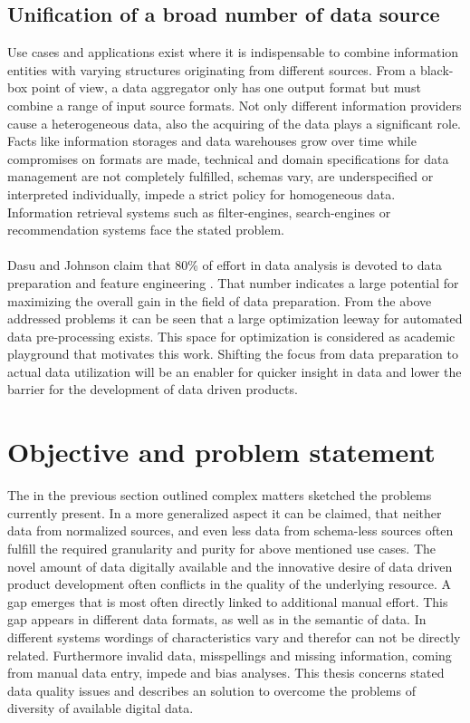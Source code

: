 \subsection{Unification of a broad number of data source} 

Use cases and applications exist where it is indispensable to combine information entities with varying structures originating from different sources. From a black-box point of view, a data aggregator only has one output format but must combine a range of input source formats. Not only different information providers cause a heterogeneous data, also the acquiring of the data plays a significant role. Facts like information storages and data warehouses grow over time while compromises on formats are made, technical and domain specifications for data management are not completely fulfilled, schemas vary, are underspecified or interpreted individually, impede a strict policy for homogeneous data. Information retrieval systems such as filter-engines, search-engines or recommendation systems face the stated problem. 
\\\\
Dasu and Johnson claim that 80\% of effort in data analysis is devoted to data preparation and feature engineering \cite{dasu_johnson_2003}. That number indicates a large potential for maximizing the overall gain in the field of data preparation. From the above addressed problems it can be seen that a large optimization leeway for automated data pre-processing exists. This space for optimization is considered as academic playground that motivates this work. Shifting the focus from data preparation to actual data utilization will be an enabler for quicker insight in data and lower the barrier for the development of data driven products.

\section{Objective and problem statement\label{sec:objective}}
The in the previous section outlined complex matters sketched the problems currently present. In a more generalized aspect it can be claimed, that neither data from normalized sources, and even less data from schema-less sources often fulfill the required granularity and purity for above mentioned use cases. The novel amount of data digitally available and the innovative desire of data driven product development often conflicts in the quality of the underlying resource. A gap emerges that is most often directly linked to additional manual effort. This gap appears in different data formats, as well as in the semantic of data. In different systems wordings of characteristics vary and therefor can not be directly related. Furthermore invalid data, misspellings and missing information, coming from manual data entry, impede and bias analyses. This thesis concerns stated data quality issues and describes an solution to overcome the problems of diversity of available digital data.  

